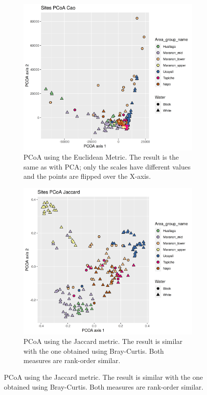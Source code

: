 \begin{figure}[h]
\centering
\begin{subfigure}{0.4\textwidth}
\includegraphics[width = \textwidth]{pcoa12eucotu}
\caption{PCoA using the Euclidean Metric. The result is the same as with PCA; only the scales have different values and the points are flipped over the X-axis.}
\end{subfigure}
\label{fig:pcoaeuc}
\begin{subfigure}{ 0.4\textwidth}
\includegraphics[width = \textwidth]{pcoa12jacotu}
\caption{PCoA using the Jaccard metric. The result is similar with the one obtained using Bray-Curtis. Both measures are rank-order similar.}
\label{fig:pcoajac}
\end{subfigure}
\end{figure}

